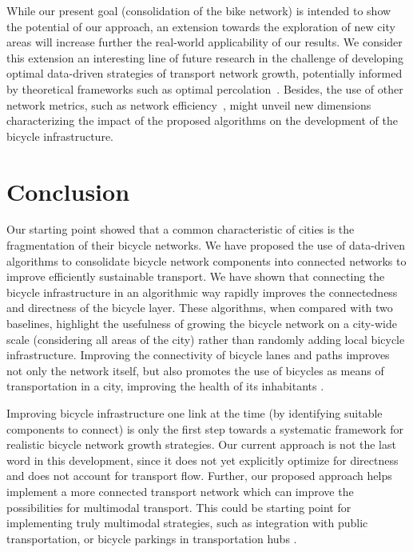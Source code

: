 While our present goal (consolidation of the bike network) is intended to show the potential of our approach, an extension towards the exploration of new city areas will increase further the real-world applicability of our results. We consider this extension an interesting line of future research in the challenge of developing optimal data-driven strategies of transport network growth, potentially informed by theoretical frameworks such as optimal percolation~\cite{achlioptas2009explosive,morone2015influence}. Besides, the use of other network metrics, such as network efficiency~\cite{latora2001efficient}, might unveil new dimensions characterizing the impact of the proposed algorithms on the development of the bicycle infrastructure.


\section{Conclusion}
Our starting point showed that a common characteristic of cities is the fragmentation of their bicycle networks. We have proposed the use of data-driven algorithms to consolidate bicycle network components into connected networks to improve efficiently sustainable transport. We have shown that connecting the bicycle infrastructure in an algorithmic way rapidly improves the connectedness and directness of the bicycle layer. These algorithms, when compared with two baselines, highlight the usefulness of growing the bicycle network on a city-wide scale (considering all areas of the city) rather than randomly adding local bicycle infrastructure. Improving the connectivity of bicycle lanes and paths improves not only the network itself, but also promotes the use of bicycles as means of transportation in a city, improving the health of its inhabitants \cite{Mueller2018Health}.

Improving bicycle infrastructure one link at the time (by identifying suitable components to connect) is only the first step towards a systematic framework for realistic bicycle network growth strategies. Our current approach is not the last word in this development, since it does not yet explicitly optimize for directness and does not account for transport flow. Further, our proposed approach helps implement a more connected transport network which can improve the possibilities for multimodal transport. This could be starting point for implementing truly multimodal strategies, such as integration with public transportation, or bicycle parkings in transportation hubs \cite{Twaddell2018Multimodal}.

